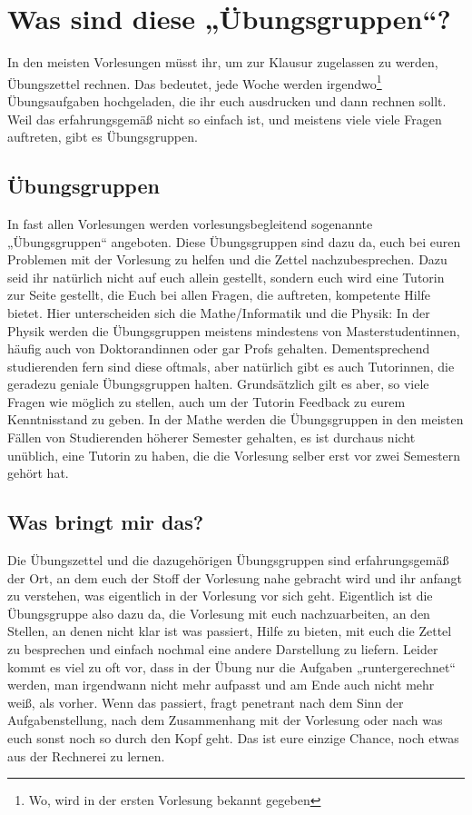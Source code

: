 \section{Was sind diese „Übungsgruppen“?}

\noindent In den meisten Vorlesungen müsst ihr, um zur Klausur zugelassen zu werden, Übungszettel rechnen. Das bedeutet, jede Woche werden irgendwo\footnote{Wo, wird in der ersten Vorlesung bekannt gegeben} Übungsaufgaben hochgeladen, die ihr euch ausdrucken und dann rechnen sollt. Weil das erfahrungsgemäß nicht so einfach ist, und meistens viele viele Fragen auftreten, gibt es Übungsgruppen.

\subsection{Übungsgruppen}
In fast allen Vorlesungen werden vorlesungsbegleitend sogenannte „Übungsgruppen“ angeboten. Diese Übungsgruppen sind dazu da, euch bei euren Problemen mit der Vorlesung zu helfen und die Zettel nachzubesprechen. Dazu seid ihr natürlich nicht auf euch allein gestellt, sondern euch wird eine Tutorin zur Seite gestellt, die Euch bei allen Fragen, die auftreten, kompetente Hilfe bietet. Hier unterscheiden sich die Mathe/Informatik und die Physik: In der Physik werden die Übungsgruppen meistens mindestens von Masterstudentinnen, häufig auch von Doktorandinnen oder gar Profs gehalten. Dementsprechend studierenden fern sind diese oftmals, aber natürlich gibt es auch Tutorinnen, die geradezu geniale Übungsgruppen halten. Grundsätzlich gilt es aber, so viele Fragen wie möglich zu stellen, auch um der Tutorin Feedback zu eurem Kenntnisstand zu geben. In der Mathe werden die Übungsgruppen in den meisten Fällen von Studierenden höherer Semester gehalten, es ist durchaus nicht unüblich, eine Tutorin zu haben, die die Vorlesung selber erst vor zwei Semestern gehört hat.

\subsection{Was bringt mir das?}
Die Übungszettel und die dazugehörigen Übungsgruppen sind erfahrungsgemäß der Ort, an dem euch der Stoff der Vorlesung nahe gebracht wird und ihr anfangt zu verstehen, was eigentlich in der Vorlesung vor sich geht. Eigentlich ist die Übungsgruppe also dazu da, die Vorlesung mit euch nachzuarbeiten, an den Stellen, an denen nicht klar ist was passiert, Hilfe zu bieten, mit euch die Zettel zu besprechen und einfach nochmal eine andere Darstellung zu liefern. Leider kommt es viel zu oft vor, dass in der Übung nur die Aufgaben „runtergerechnet“ werden, man irgendwann nicht mehr aufpasst und am Ende auch nicht mehr weiß, als vorher. Wenn das passiert, fragt penetrant nach dem Sinn der Aufgabenstellung, nach dem Zusammenhang mit der Vorlesung oder nach was euch sonst noch so durch den Kopf geht. Das ist eure einzige Chance, noch etwas aus der Rechnerei zu lernen.

